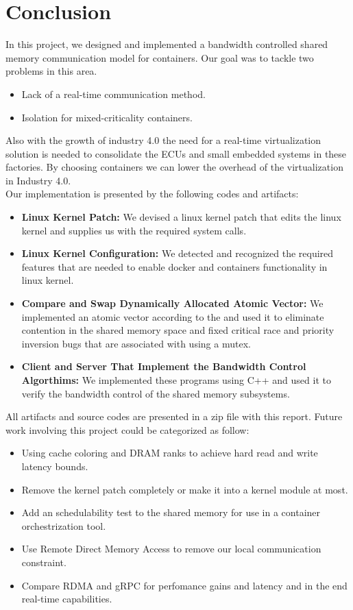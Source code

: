 \documentclass[a4paper, 10pt]{article}
\theoremstyle{nonumberplain}
\begin{document}
\section{Conclusion}
In this project, we designed and implemented a bandwidth controlled shared memory
communication model for containers. Our goal was to tackle two problems in this
area.
\begin{itemize}
    \item Lack of a real-time communication method.
    \item Isolation for mixed-criticality containers.
\end{itemize}
Also with the growth of industry 4.0 the need for a real-time
virtualization solution is needed to consolidate the ECUs and small embedded
systems in these factories. By choosing containers we can lower the overhead
of the virtualization in Industry 4.0. \\
Our implementation is presented by the following codes and artifacts:
\begin{itemize}
    \item \textbf{Linux Kernel Patch:} We devised a linux kernel patch that
        edits the linux kernel and supplies us with the required system calls.
    \item \textbf{Linux Kernel Configuration:} We detected and recognized the
    required features that are needed to enable docker and containers
    functionality in linux kernel.
    \item \textbf{Compare and Swap Dynamically Allocated Atomic Vector:}
    We implemented an atomic vector according to the \cite{vector} and used
    it to eliminate contention in the shared memory space and fixed
    critical race and priority inversion bugs that are associated with
    using a mutex.
    \item \textbf{Client and Server That Implement the Bandwidth Control
        Algorthims:} We implemented these programs using C++ and used it to
        verify the bandwidth control of the shared memory subsystems.
\end{itemize}
All artifacts and source codes are presented in a zip file with this report.
Future work involving this project could be categorized as follow:
\begin{itemize}
    \item Using cache coloring and DRAM ranks to achieve hard read and write
        latency bounds.
    \item Remove the kernel patch completely or make it into a kernel module
        at most.
    \item Add an schedulability test to the shared memory for use in a container
        orchestrization tool.
    \item Use Remote Direct Memory Access to remove our local communication
        constraint.
    \item Compare RDMA and gRPC for perfomance gains and latency and in the end
        real-time capabilities.
\end{itemize}
\end{document}
